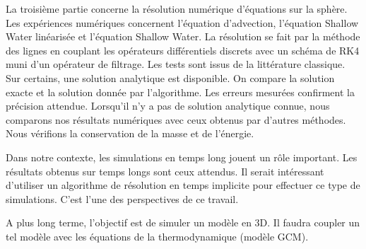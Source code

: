 \begin{FrenchAbstract}
La troisième partie concerne la résolution numérique d'équations sur la sphère. Les expériences numériques concernent l'équation d'advection, l'équation Shallow Water linéarisée et l'équation Shallow Water. La résolution se fait par la méthode des lignes en couplant les opérateurs différentiels discrets avec un schéma de RK4 muni d'un opérateur de filtrage. Les tests sont issus de la littérature classique. Sur certains, une solution analytique est disponible. On compare la solution exacte et la solution donnée par l'algorithme. Les erreurs mesurées confirment la précision attendue. Lorsqu'il n'y a pas de solution analytique connue, nous comparons nos résultats numériques avec ceux obtenus par d’autres méthodes. Nous vérifions la conservation de la masse et de l'énergie. 

Dans notre contexte, les simulations en temps long jouent un rôle important. Les résultats obtenus sur temps longs sont ceux attendus. Il serait intéressant d'utiliser un algorithme de résolution en temps implicite pour effectuer ce type de simulations. C'est l'une des perspectives de ce travail.

A plus long terme, l'objectif est de simuler un modèle en 3D. Il faudra coupler un tel modèle avec les équations de la thermodynamique (modèle GCM).


  \end{FrenchAbstract}
  
  
  
  
  
  
  
